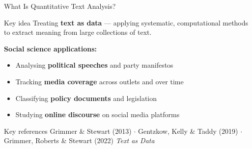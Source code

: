 \documentclass[aspectratio=169]{beamer}
\begin{document}
\begin{frame}{What Is Quantitative Text Analysis?}
    \small
    \begin{alertblock}{Key idea}
        Treating \textbf{text as data} --- applying systematic, computational methods to extract meaning from large collections of text.
    \end{alertblock}

    \textbf{Social science applications:}
    \begin{itemize}\setlength\itemsep{0pt}
        \item Analysing \textbf{political speeches} and party manifestos
        \item Tracking \textbf{media coverage} across outlets and over time
        \item Classifying \textbf{policy documents} and legislation
        \item Studying \textbf{online discourse} on social media platforms
    \end{itemize}

    \begin{exampleblock}{Key references}
        \footnotesize
        Grimmer \& Stewart (2013) \(\cdot\)
        Gentzkow, Kelly \& Taddy (2019) \(\cdot\)
        Grimmer, Roberts \& Stewart (2022) \textit{Text as Data}
    \end{exampleblock}
\end{frame}
\end{document}
